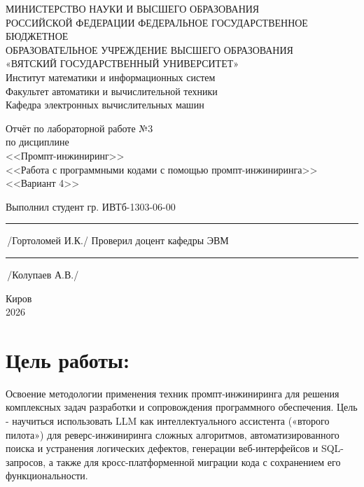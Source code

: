 \documentclass[oneside,a4paper,14pt]{extarticle} %
\begin{document}
	\newpage\thispagestyle{empty}
	\begin{center}
		МИНИСТЕРСТВО НАУКИ И ВЫСШЕГО ОБРАЗОВАНИЯ\\
			РОССИЙСКОЙ ФЕДЕРАЦИИ
			ФЕДЕРАЛЬНОЕ ГОСУДАРСТВЕННОЕ БЮДЖЕТНОЕ\\
			ОБРАЗОВАТЕЛЬНОЕ
			УЧРЕЖДЕНИЕ ВЫСШЕГО ОБРАЗОВАНИЯ\\
			«ВЯТСКИЙ ГОСУДАРСТВЕННЫЙ УНИВЕРСИТЕТ»\\
			Институт математики и информационных систем\\
			Факультет автоматики и вычислительной техники\\
			Кафедра электронных вычислительных машин
	\end{center}
	\vspace{20mm}

	\begin{center}
		Отчёт по лабораторной работе №3\\
		по дисциплине\\
		<<Промпт-инжиниринг>>\\
		<<Работа с программными кодами с помощью промпт-инжиниринга>>\\
		<<Вариант 4>>\\
	\end{center}
	\vspace{48mm}

	\noindent
	Выполнил студент гр. ИВТб-1303-06-00 \hfill \rule[-0,5mm]{30mm}{0.15mm}\,/Гортоломей И.К./
	\newline
	Проверил доцент кафедры ЭВМ \hfill \rule[-0,5mm]{30mm}{0.15mm}\,/Колупаев А.В./

	\vfill
	\begin{center}
		Киров\\
		2026
	\end{center}

	\newpage
	\thispagestyle{empty}

	\section*{Цель работы:}
	Освоение методологии применения техник промпт-инжиниринга для решения комплексных задач разработки
	и сопровождения программного обеспечения. Цель - научиться использовать LLM как интеллектуального
	ассистента («второго пилота») для реверс-инжиниринга сложных алгоритмов, автоматизированного поиска и
	устранения логических дефектов, генерации веб-интерфейсов и SQL-запросов, а также для кросс-платформенной
	миграции кода с сохранением его функциональности.
\end{document}
